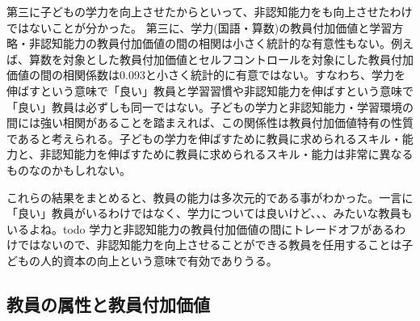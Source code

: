 \documentclass[a4paper,12pt]{article}
\begin{document}
第三に子どもの学力を向上させたからといって、非認知能力をも向上させたわけではないことが分かった。
第三に、学力(国語・算数)の教員付加価値と学習方略・非認知能力の教員付加価値の間の相関は小さく統計的な有意性もない。例えば、算数を対象とした教員付加価値とセルフコントロールを対象にした教員付加価値の間の相関係数は0.093と小さく統計的に有意ではない。すなわち、学力を伸ばすという意味で「良い」教員と学習習慣や非認知能力を伸ばすという意味で「良い」教員は必ずしも同一ではない。子どもの学力と非認知能力・学習環境の間には強い相関があることを踏まえれば、この関係性は教員付加価値特有の性質であると考えられる。子どもの学力を伸ばすために教員に求められるスキル・能力と、非認知能力を伸ばすために教員に求められるスキル・能力は非常に異なるものなのかもしれない。





これらの結果をまとめると、教員の能力は多次元的である事がわかった。一言に「良い」教員がいるわけではなく、学力については良いけど、、、みたいな教員もいるよね。todo
学力と非認知能力の教員付加価値の間にトレードオフがあるわけではないので、非認知能力を向上させることができる教員を任用することは子どもの人的資本の向上という意味で有効でありうる。




\subsection{教員の属性と教員付加価値}
\end{document}
